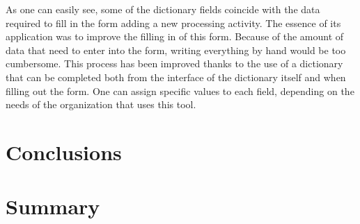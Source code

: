 \documentclass[en, noamssymb]{mgr}
\begin{document}
As one can easily see, some of the dictionary fields coincide with the data required to fill in the form adding a new processing activity. The essence of its application was to improve the filling in of this form. Because of the amount of data that need to enter into the form, writing everything by hand would be too cumbersome. This process has been improved thanks to the use of a dictionary that can be completed both from the interface of the dictionary itself and when filling out the form. One can assign specific values to each field, depending on the needs of the organization that uses this tool.

\chapter{Conclusions} \label{sec:sekcjaWnioski}

\chapter{Summary}
\label{sec:Podsumowanie}
\end{document}
